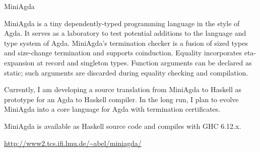 \documentclass{scrreprt}
\begin{document}
\begin{hcarentry}{MiniAgda}
\makeheader

MiniAgda is a tiny dependently-typed programming language in the style
of Agda.  It serves as a laboratory to test potential additions to the
language and type system of Agda.  MiniAgda's termination checker is a
fusion of sized types and size-change termination and supports
coinduction.  Equality incorporates eta-expansion at record and
singleton types.  Function arguments can be declared as static; such
arguments are discarded during equality checking and compilation.

Currently, I am developing a source translation from MiniAgda to
Haskell as prototype for an Agda to Haskell compiler.  In the long
run, I plan to evolve MiniAgda into a core language for Agda with
termination certificates.

MiniAgda is available as Haskell source code and compiles with GHC
6.12.x. 

\FurtherReading
  \url{http://www2.tcs.ifi.lmu.de/\~abel/miniagda/}
\end{hcarentry}
\end{document}
